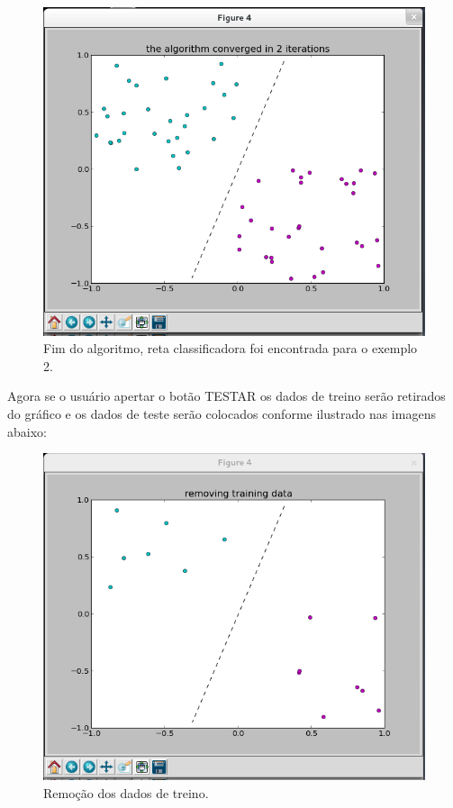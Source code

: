 \documentclass[brazil, a4paper]{article}
\begin{document}
\begin{description}
\newpage

\begin{figure}[!htb]
\centering
\includegraphics[scale=0.42]{ex2-3.png}
\caption{Fim do algoritmo, reta classificadora foi encontrada para o exemplo 2.}
\end{figure}

Agora se o usuário apertar o botão TESTAR os dados de treino serão retirados do
gráfico e os dados de teste serão colocados conforme ilustrado nas imagens
abaixo:

\begin{figure}[!htb]
\centering
\includegraphics[scale=0.42]{ex2-t1.png}
\caption{Remoção dos dados de treino.}
\end{figure}


\end{description}
\end{document}
